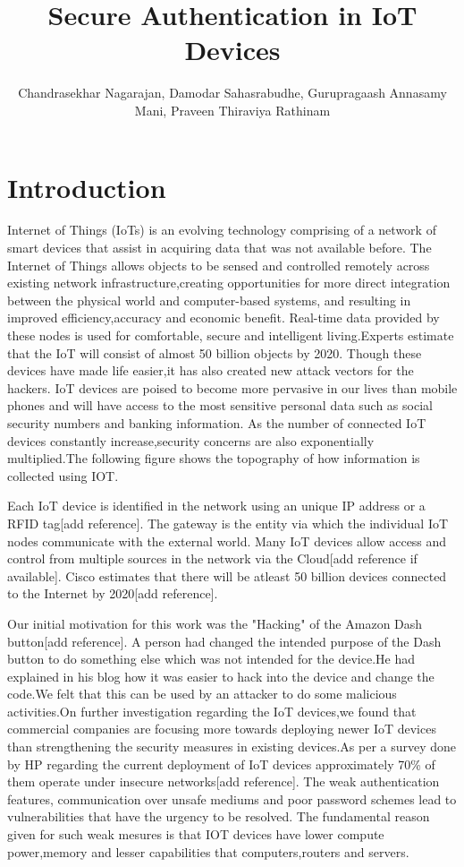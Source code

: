 \documentclass[letterpaper,twocolumn,10pt]{article}
\title{Secure Authentication in IoT Devices}
\author{Chandrasekhar Nagarajan, Damodar Sahasrabudhe, Gurupragaash Annasamy Mani, Praveen Thiraviya Rathinam }
\affil{School of Computing, University of Utah}
\begin{document}
\maketitle
\section{Introduction}

   Internet of Things (IoTs) is an evolving technology comprising of a network of smart devices that assist in acquiring data that was not available before. The Internet of Things allows objects to be sensed and controlled remotely across existing network infrastructure,creating opportunities for more direct integration between the physical world and computer-based systems, and resulting in improved efficiency,accuracy and economic benefit. Real-time data provided by these nodes is used for comfortable, secure and intelligent living.Experts estimate that the IoT will consist of almost 50 billion objects by 2020.
   Though these devices have made life easier,it has also created new attack vectors for the hackers. IoT devices are poised to become more pervasive in our lives than mobile phones and will have access to the most sensitive personal data such as social security numbers and banking information. As the number of connected IoT devices constantly increase,security concerns are also exponentially multiplied.The following figure shows the topography of how information is collected using IOT.
   
   Each IoT device is identified in the network using an unique IP address or a RFID tag[add reference]. The gateway is the entity via which the individual IoT nodes communicate with the external world. Many IoT devices allow access and control from multiple sources in the network via the Cloud[add reference if available]. Cisco estimates that there will be atleast 50 billion devices connected to the Internet by 2020[add reference].
   
   
   Our initial motivation for this work was the "Hacking" of the Amazon Dash button[add reference]. A person had changed the intended purpose of the Dash button to do something else which was not intended for the device.He had explained in his blog how it was easier to hack into the device and change the code.We felt that this can be used by an attacker to do some malicious activities.On further investigation regarding the IoT devices,we found that commercial companies are focusing more towards deploying newer IoT devices than strengthening the security measures in existing devices.As per a survey done by HP regarding the current deployment of IoT devices approximately 70\% of them operate under insecure networks[add reference]. The weak authentication features, communication over unsafe mediums and poor password schemes lead to vulnerabilities that have the urgency to be resolved. The fundamental reason given for such weak mesures is that IOT devices have lower compute power,memory and lesser capabilities that computers,routers and servers.
   
\end{document}
